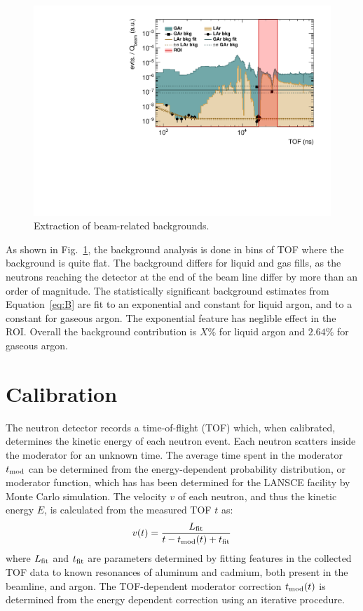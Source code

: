 \documentclass[%
 reprint,
superscriptaddress,
 preprintnumbers,
 nofootinbib,
 nobibnotes,
 bibnotes,
 amsmath,amssymb,
 aps,
 prl, 
 floatfix,
]{revtex4-1}
\begin{document}
\begin{figure}[htbp]\centering
\includegraphics[width=\linewidth]{Figures/background.pdf}
\caption{Extraction of beam-related backgrounds.}
\label{fig:bkg}
\end{figure}

As shown in Fig.~\ref{fig:bkg}, the background analysis is done in
bins of TOF where the background is quite flat.  The background
differs for liquid and gas fills, as the neutrons reaching the
detector at the end of the beam line differ by more than an order of
magnitude.  The statistically significant background estimates from
Equation~\ref{eq:B} are fit to an exponential and constant for liquid
argon, and to a constant for gaseous argon.  The exponential feature
has neglible effect in the ROI.  Overall the background contribution
is {\color{red} $X\%$} for liquid argon and $2.64\%$ for gaseous
argon.

\section{Calibration}

The neutron detector records a time-of-flight (TOF) which, when
calibrated, determines the kinetic energy of each neutron event.
Each neutron scatters inside the moderator for an unknown time.  The
average time spent in the moderator $t_{\rm mod}$ can be determined
from the energy-dependent probability distribution, or moderator
function, which has has been determined for the LANSCE facility by
Monte Carlo simulation\cite{moderator}.  The velocity $v$ of each
neutron, and thus the kinetic energy $E$, is calculated from the
measured TOF $t$ as:
\begin{equation}
  v(t) = \frac{L_{\rm fit}}{ t - t_{\rm mod}(t) + t_{\rm fit} } 
\label{eq:v(t)}
\end{equation}
where $L_{\rm fit}$ and $t_{\rm fit}$ are parameters determined by
fitting features in the collected TOF data to known resonances of
aluminum and cadmium, both present in the beamline, and argon.  The
TOF-dependent moderator correction $t_{\rm mod}(t)$ is determined from
the energy dependent correction using an iterative
procedure.
\end{document}
